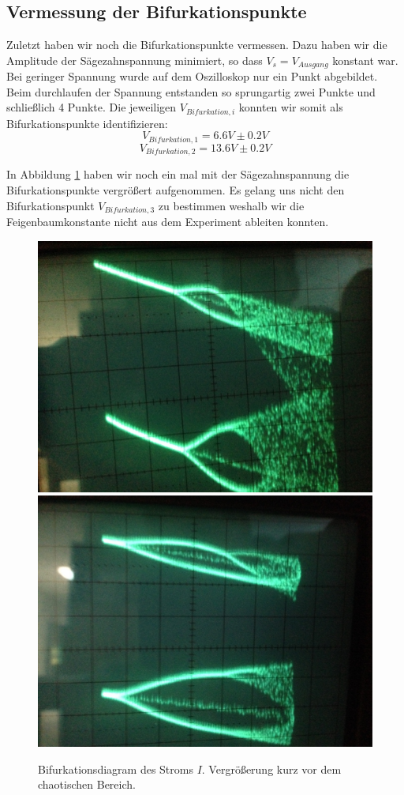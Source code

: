 \documentclass[11,5pt, twoside]{article}
\begin{document}
\subsection { Vermessung der Bifurkationspunkte }
Zuletzt haben wir noch die Bifurkationspunkte vermessen. Dazu haben wir die Amplitude der Sägezahnspannung minimiert, so dass $V_s=V_{Ausgang}$ konstant war. Bei geringer Spannung wurde auf dem Oszilloskop nur ein Punkt abgebildet. Beim durchlaufen der Spannung entstanden so sprungartig zwei Punkte und schließlich 4 Punkte. Die jeweiligen $V_{Bifurkation, i}$ konnten wir somit als Bifurkationspunkte identifizieren: 
$$V_{Bifurkation, 1}=6.6V \pm 0.2V$$
$$V_{Bifurkation, 2}=13.6V \pm 0.2V$$

In Abbildung \ref{fig:ldr-bifurc-zoom} haben wir noch ein mal mit der Sägezahnspannung die Bifurkationspunkte vergrößert aufgenommen. Es gelang uns nicht den Bifurkationspunkt $V_{Bifurkation, 3}$ zu bestimmen weshalb wir die Feigenbaumkonstante nicht aus dem Experiment ableiten konnten.

\begin{figure}[!htbp]
\centering
\includegraphics[scale=0.18]{bif-ldr/bifurc-zoom}
\includegraphics[scale=0.18]{bif-ldr/bifurc-zoom2}
\caption{Bifurkationsdiagram des Stroms $I$. Vergrößerung kurz vor dem chaotischen Bereich.}
\label{fig:ldr-bifurc-zoom}
\end{figure}
\end{document}
